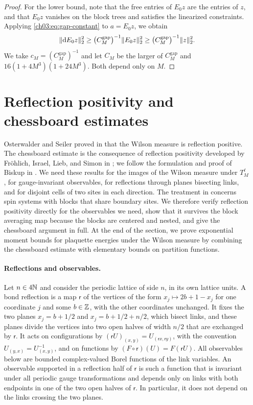 \begin{proof}
For the lower bound, note that the free entries of $E_0z$ are the entries of $z$, and that $E_0z$ vanishes on the block trees and satisfies the linearized constraints. Applying \eqref{ch03:eq:gap-constant} to $a=E_0z$, we obtain
\[
 \lVert \mathrm dE_0z\rVert_2^2\ge\bigl(C_M^{\mathrm{gap}}\bigr)^{-1}\lVert E_0z\rVert_2^2\ge\bigl(C_M^{\mathrm{gap}}\bigr)^{-1}\lVert z\rVert_2^2.
\]
We take $c_M=(C_M^{\mathrm{gap}})^{-1}$ and let $C_M$ be the larger of $C_M^{\mathrm{gap}}$ and $16(1+4M^3)(1+24M^3)$. Both depend only on $M$.
\end{proof}

\section{Reflection positivity and chessboard estimates}\label{ch03:sec:reflection-observables}

Osterwalder and Seiler proved in \cite{OsterwalderSeiler1978} that the Wilson measure is reflection positive. The chessboard estimate is the consequence of reflection positivity developed by Fr\"ohlich, Israel, Lieb, and Simon in \cite{FILS1978,FILS1980}; we follow the formulation and proof of Biskup in \cite[Theorem~5.8 and (5.34)--(5.35)]{Biskup2009}. We need these results for the images of the Wilson measure under $T_M^\ell$, for gauge-invariant observables, for reflections through planes bisecting links, and for disjoint cells of two sites in each direction. The treatment in \cite{Biskup2009} concerns spin systems with blocks that share boundary sites. We therefore verify reflection positivity directly for the observables we need, show that it survives the block averaging map because the blocks are centered and nested, and give the chessboard argument in full. At the end of the section, we prove exponential moment bounds for plaquette energies under the Wilson measure by combining the chessboard estimate with elementary bounds on partition functions.

\paragraph{Reflections and observables.}
Let $n\in4\mathbb N$ and consider the periodic lattice of side $n$, in its own lattice units. A bond reflection is a map $\mathsf r$ of the vertices of the form $x_j\mapsto2b+1-x_j$ for one coordinate $j$ and some $b\in\mathbb Z$, with the other coordinates unchanged. It fixes the two planes $x_j=b+1/2$ and $x_j=b+1/2+n/2$, which bisect links, and these planes divide the vertices into two open halves of width $n/2$ that are exchanged by $\mathsf r$. It acts on configurations by $(\mathsf rU)_{(x,y)}=U_{(\mathsf rx,\mathsf ry)}$, with the convention $U_{(y,x)}=U_{(x,y)}^{-1}$, and on functions by $(F\circ\mathsf r)(U)=F(\mathsf rU)$. All observables below are bounded complex-valued Borel functions of the link variables. An observable supported in a reflection half of $\mathsf r$ is such a function that is invariant under all periodic gauge transformations and depends only on links with both endpoints in one of the two open halves of $\mathsf r$. In particular, it does not depend on the links crossing the two planes.

